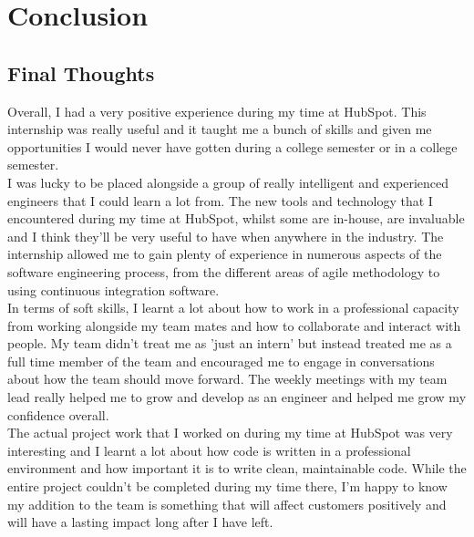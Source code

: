 \chapter{Conclusion}
\section{Final Thoughts}
Overall, I had a very positive experience during my time at HubSpot. This internship was really useful and it taught me a bunch of skills and given me opportunities I would never have gotten during a college semester or in a college semester. \newline \\ I was lucky to be placed alongside a group of really intelligent and experienced engineers that I could learn a lot from. The new tools and technology that I encountered during my time at HubSpot, whilst some are in-house, are invaluable and I think they'll be very useful to have when anywhere in the industry. The internship allowed me to gain plenty of experience in numerous aspects of the software engineering process, from the different areas of agile methodology to using continuous integration software. \newline \\ In terms of soft skills, I learnt a lot about how to work in a professional capacity from working alongside my team mates and how to collaborate and interact with people. My team didn't treat me as 'just an intern' but instead treated me as a full time member of the team and encouraged me to engage in conversations about how the team should move forward. The weekly meetings with my team lead really helped me to grow and develop as an engineer and helped me grow my confidence overall. \newline \\  The actual project work that I worked on during my time at HubSpot was very interesting and I learnt a lot about how code is written in a professional environment and how important it is to write clean, maintainable code. While the entire project couldn't be completed during my time there, I'm happy to know my addition to the team is something that will affect customers positively and will have a lasting impact long after I have left. 